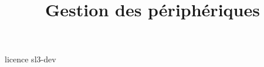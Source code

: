 \documentclass [xcolor=table] {beamer}
\title {Gestion des périphériques}
\begin{document}
 {licence}
 {sl3-dev}
\end{document}

